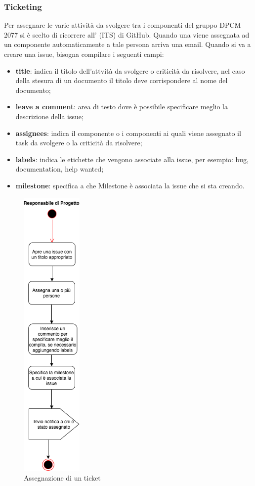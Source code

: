 \subsubsection{Ticketing}
Per assegnare le varie attività da svolgere tra i componenti del gruppo DPCM 2077 si è scelto di ricorrere all' (ITS) di GitHub.
Quando una  viene assegnata ad un componente automaticamente a tale persona arriva una email.
Quando si va a creare una issue, bisogna compilare i seguenti campi:
\begin{itemize}
\item{\textbf{title}: indica il titolo dell'attvità da svolgere o criticità da risolvere, nel caso della stesura di un documento il titolo deve corrispondere al nome del documento;}
\item{\textbf{leave a comment}: area di testo dove è possibile specificare meglio la descrizione della issue;}
\item{\textbf{assignees}: indica il componente o i componenti ai quali viene assegnato il task da svolgere o la criticità da risolvere;}
\item{\textbf{labels}: indica le etichette che vengono associate alla issue, per esempio: bug, documentation, help wanted;}
\item{\textbf{milestone}: specifica a che Milestone è associata la issue che si sta creando.}
\end{itemize} 
\begin{figure}[H]
	\centering
	\includegraphics[width=3cm]{res/images/ticket.png}
	\caption{Assegnazione di un ticket}
	\label{fig:Assegnazione di un ticket}
\end{figure}


